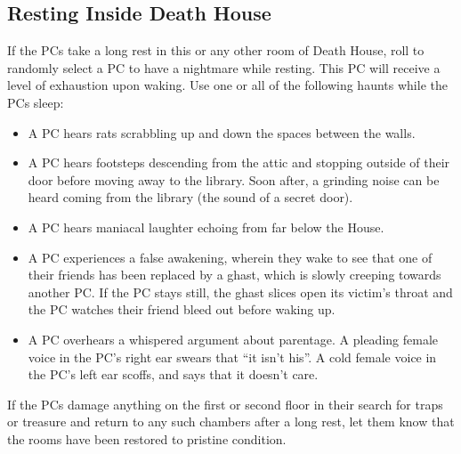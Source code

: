 \documentclass[a4paper,11pt]{article}
\begin{document}
\pagebreak
\subsection*{Resting Inside Death House}
\label{sec:RestingInsideDeathHouse}
If the PCs take a long rest in this or any other room of Death House, roll to randomly select a PC to have
a nightmare while resting. This PC will receive a level of exhaustion upon waking. Use one or all of the
following haunts while the PCs sleep:
\begin{itemize}
  \item A PC hears rats scrabbling up and down the spaces between the walls.
  \item A PC hears footsteps descending from the attic and stopping outside of their door before moving away
  to the library. Soon after, a grinding noise can be heard coming from the library (the sound of a secret door).
  \item A PC hears maniacal laughter echoing from far below the House.
  \item A PC experiences a false awakening, wherein they wake to see that one of their friends has been replaced
  by a ghast, which is slowly creeping towards another PC. If the PC stays still, the ghast slices open its
  victim's throat and the PC watches their friend bleed out before waking up.
  \item A PC overhears a whispered argument about parentage. A pleading female voice in the PC's right ear
  swears that ``it isn't his''. A cold female voice in the PC's left ear scoffs, and says that it doesn't care.
\end{itemize}
If the PCs damage anything on the first or second floor in their search for traps or treasure and return to
any such chambers after a long rest, let them know that the rooms have been restored to pristine condition.
\end{document}
